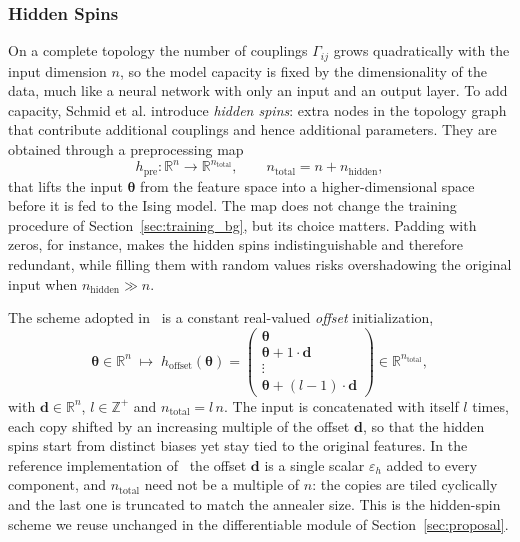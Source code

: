 \documentclass{ieeeaccess}
\begin{document}
\subsubsection{Hidden Spins}\label{sec:hidden_spins}

On a complete topology the number of couplings $\Gamma_{ij}$ grows
quadratically with the input dimension $n$, so the model capacity is fixed by
the dimensionality of the data, much like a neural network with only an input
and an output layer. To add capacity, Schmid et al. introduce \emph{hidden
spins}: extra nodes in the topology graph that contribute additional couplings
and hence additional parameters. They are obtained through a preprocessing
map
\begin{equation}
h_{\mathrm{pre}} : \mathbb{R}^n \to \mathbb{R}^{n_{\mathrm{total}}},
\qquad n_{\mathrm{total}} = n + n_{\mathrm{hidden}},
\label{eq:hpre}
\end{equation}
that lifts the input $\boldsymbol{\theta}$ from the feature space into a
higher-dimensional space before it is fed to the Ising model. The map does not
change the training procedure of Section~\ref{sec:training_bg}, but its choice
matters. Padding with zeros, for instance, makes the hidden spins
indistinguishable and therefore redundant, while filling them with random
values risks overshadowing the original input when
$n_{\mathrm{hidden}} \gg n$.

The scheme adopted in~\cite{10.21468/SciPostPhysCore.7.1.013} is a constant
real-valued \emph{offset} initialization,
\begin{equation}
\boldsymbol{\theta} \in \mathbb{R}^n \;\mapsto\;
h_{\mathrm{offset}}(\boldsymbol{\theta}) =
\begin{pmatrix}
\boldsymbol{\theta} \\
\boldsymbol{\theta} + 1 \cdot \mathbf{d} \\
\vdots \\
\boldsymbol{\theta} + (l-1)\cdot \mathbf{d}
\end{pmatrix}
\in \mathbb{R}^{n_{\mathrm{total}}},
\label{eq:offset}
\end{equation}
with $\mathbf{d} \in \mathbb{R}^n$, $l \in \mathbb{Z}^+$ and
$n_{\mathrm{total}} = l\,n$. The input is concatenated with itself $l$ times,
each copy shifted by an increasing multiple of the offset $\mathbf{d}$, so that
the hidden spins start from distinct biases yet stay tied to the original
features. In the reference implementation
of~\cite{10.21468/SciPostPhysCore.7.1.013} the offset $\mathbf{d}$ is a single
scalar $\varepsilon_h$ added to every component, and $n_{\mathrm{total}}$ need
not be a multiple of $n$: the copies are tiled cyclically and the last one is
truncated to match the annealer size. This is the hidden-spin scheme we reuse
unchanged in the differentiable module of Section~\ref{sec:proposal}.
\end{document}
